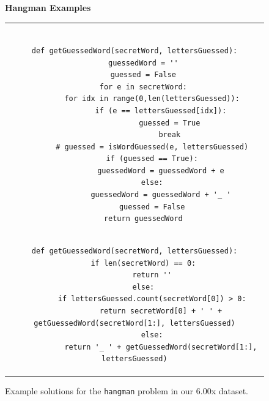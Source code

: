 \documentclass[12pt,twoside]{mitthesis}
\newcommand \codevar[1]{\texttt{#1}}
\begin{document}
\begin{figure}
{\bf Hangman Examples} \\
\begin{tabular}{c}
\begin{minipage}{1.0\linewidth}
\begin{lstlisting}[]

def getGuessedWord(secretWord, lettersGuessed):
    guessedWord = ''
    guessed = False
    for e in secretWord:
        for idx in range(0,len(lettersGuessed)):
            if (e == lettersGuessed[idx]):
                guessed = True
                break
        # guessed = isWordGuessed(e, lettersGuessed)
        if (guessed == True):
            guessedWord = guessedWord + e
        else:
            guessedWord = guessedWord + '_ '
        guessed = False
    return guessedWord
\end{lstlisting}
\end{minipage}
\\
\begin{minipage}{1.0\linewidth}
\begin{lstlisting}[]
def getGuessedWord(secretWord, lettersGuessed):
    if len(secretWord) == 0:
        return ''
    else:
        if lettersGuessed.count(secretWord[0]) > 0:
            return secretWord[0] + ' ' + getGuessedWord(secretWord[1:], lettersGuessed)
        else:
            return '_ ' + getGuessedWord(secretWord[1:], lettersGuessed)
\end{lstlisting}
\end{minipage}
\end{tabular}
\caption{Example solutions for the \codevar{hangman} problem in our 6.00x dataset.}
\label{hmexamples}
\end{figure}
\end{document}
